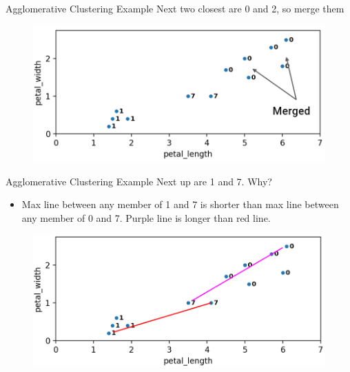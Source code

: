 \documentclass[aspectratio=169]{../latex_main/tntbeamer}  %
\begin{document}
	
	\begin{frame}{Agglomerative Clustering Example}
	    Next two closest are 0 and 2, so merge them
	    \begin{figure}
	        \centering
	        \includegraphics[scale=.35]{Bild47}
	    \end{figure}
	\end{frame}
	
	
	\begin{frame}{Agglomerative Clustering Example}
	    Next up are 1 and 7. Why?
	    \begin{itemize}
	        \item Max line between any member of 1 and 7 is shorter than max line between any member of 0 and 7. Purple line is longer than red line.
	    \end{itemize}
	    \begin{figure}
	        \centering
	        \includegraphics[scale=.35]{Bild48}
	    \end{figure}
	\end{frame}
	
	
	
\end{document}
